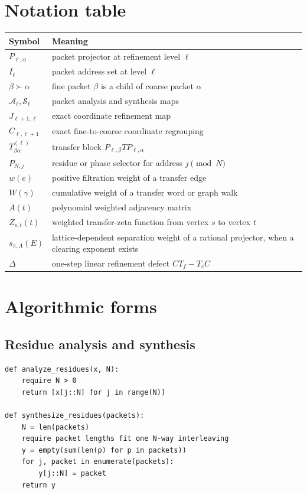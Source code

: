 \documentclass[11pt,a4paper]{article}
\theoremstyle{definition}
\theoremstyle{remark}
\providecommand{\cA}{\mathcal A}
\providecommand{\cS}{\mathcal S}
\theoremstyle{definition}\newtheorem{construction}[theorem]{Construction}\newtheorem{certificate}[theorem]{Numerical Certificate}
\theoremstyle{remark}\newtheorem{boundary}[theorem]{Boundary}
\begin{document}
\appendix
\section{Notation table}

\begin{longtable}{L{0.28\textwidth}L{0.64\textwidth}}
\toprule
Symbol & Meaning \\
\midrule
\endhead
$P_{\ell,\alpha}$ & packet projector at refinement level $\ell$ \\
$I_\ell$ & packet address set at level $\ell$ \\
$\beta\succ\alpha$ & fine packet $\beta$ is a child of coarse packet $\alpha$ \\
$\cA_\ell,\cS_\ell$ & packet analysis and synthesis maps \\
$J_{\ell+1,\ell}$ & exact coordinate refinement map \\
$C_{\ell,\ell+1}$ & exact fine-to-coarse coordinate regrouping \\
$T^{(\ell)}_{\beta\alpha}$ & transfer block $P_{\ell,\beta}TP_{\ell,\alpha}$ \\
$P_{N,j}$ & residue or phase selector for address $j\pmod N$ \\
$w(e)$ & positive filtration weight of a transfer edge \\
$W(\gamma)$ & cumulative weight of a transfer word or graph walk \\
$A(t)$ & polynomial weighted adjacency matrix \\
$Z_{s,t}(t)$ & weighted transfer-zeta function from vertex $s$ to vertex $t$ \\
$s_{\pi,\Lambda}(E)$ & lattice-dependent separation weight of a rational projector, when a clearing exponent exists \\
$\Delta$ & one-step linear refinement defect $CT_f-T_cC$ \\
\bottomrule
\end{longtable}

\section{Algorithmic forms}\label{sec:algorithms}

\subsection{Residue analysis and synthesis}\label{alg:residue}

\begin{lstlisting}
def analyze_residues(x, N):
    require N > 0
    return [x[j::N] for j in range(N)]

def synthesize_residues(packets):
    N = len(packets)
    require packet lengths fit one N-way interleaving
    y = empty(sum(len(p) for p in packets))
    for j, packet in enumerate(packets):
        y[j::N] = packet
    return y
\end{lstlisting}
\end{document}
